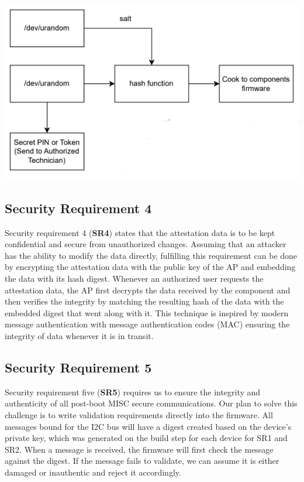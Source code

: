 \documentclass{prace}
\begin{document}
\includegraphics{./diagramSR3.png}

\subsection{Security Requirement 4}
Security requirement 4 (\textbf{SR4}) states that the attestation data is to be kept confidential and secure from unauthorized changes.
 Assuming that an attacker has the ability to modify the data directly, fulfilling this requirement can be done by encrypting 
 the attestation data with the public key of the AP and embedding the data with its hash digest. Whenever an authorized user 
 requests the attestation data, the AP first decrypts the data received by the component and then verifies the integrity by 
 matching the resulting hash of the data with the embedded digest that went along with it. This technique is inspired by modern 
 message authentication with message authentication codes (MAC) ensuring the integrity of data whenever it is in transit.

\subsection{Security Requirement 5}
Security requirement five (\textbf{SR5}) requires us to ensure the integrity and authenticity of all
post-boot MISC secure communications. Our plan to solve this challenge is to write validation
requirements directly into the firmware. All messages bound for the I2C bus will have a
digest created based on the device's private key, which was generated on the build step for
each device for SR1 and SR2. When a message is received, the firmware will first check the message
against the digest. If the message fails to validate, we can assume it is either damaged
or inauthentic and reject it accordingly.
\end{document}
